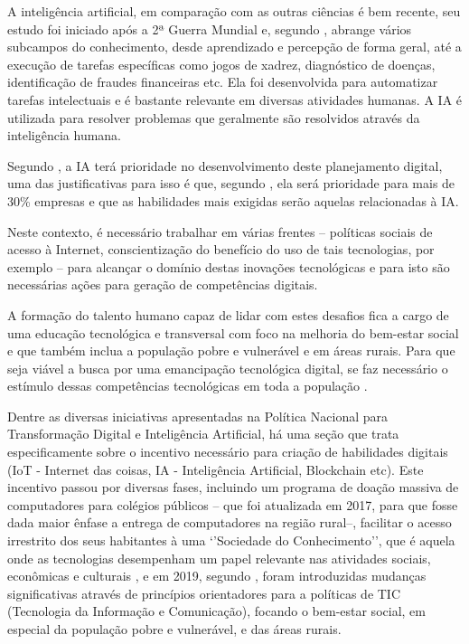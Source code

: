 A inteligência artificial, em comparação com as outras ciências é bem recente, seu estudo foi iniciado após a 2ª Guerra Mundial e, segundo \cite{gomes2010inteligencia}, abrange vários subcampos do conhecimento, desde aprendizado e percepção de forma geral, até a execução de tarefas específicas como jogos de xadrez, diagnóstico de doenças, identificação de fraudes financeiras etc. Ela foi desenvolvida para automatizar tarefas intelectuais e é bastante relevante em diversas atividades humanas. A IA é utilizada para resolver problemas que geralmente são resolvidos através da inteligência humana.

Segundo \cite{de2019politica}, a IA terá prioridade no desenvolvimento deste planejamento digital, uma das justificativas para isso é que, segundo \cite{andrews2017predicts}, ela será prioridade para mais de 30\% empresas e que as habilidades mais exigidas serão aquelas relacionadas à IA.

Neste contexto, é necessário trabalhar em várias frentes -- políticas sociais de acesso à Internet, conscientização do benefício do uso de tais tecnologias, por exemplo -- para alcançar o domínio destas inovações tecnológicas e para isto são necessárias ações para geração de competências digitais.

A formação do talento humano capaz de lidar com estes desafios fica a cargo de uma educação tecnológica e transversal com foco na melhoria do bem-estar social e que também inclua a população pobre e vulnerável e em áreas rurais. Para que seja viável a busca por uma emancipação tecnológica digital, se faz necessário o estímulo dessas competências tecnológicas em toda a população \cite{de2019politica}.

Dentre as diversas iniciativas apresentadas na Política Nacional para Transformação Digital e Inteligência Artificial, há uma seção que trata especificamente sobre o incentivo necessário para criação de habilidades digitais (IoT - Internet das coisas, IA - Inteligência Artificial, Blockchain etc). Este incentivo passou por diversas fases, incluindo um programa de doação massiva de computadores para colégios públicos \cite{compes3063} -- que foi atualizada em 2017, para que fosse dada maior ênfase a entrega de computadores na região rural--, facilitar o acesso irrestrito dos seus habitantes à uma `'Sociedade do Conhecimento'', que é aquela onde as tecnologias desempenham um papel relevante nas atividades sociais, econômicas e culturais \cite{informationsociety}, e em 2019, segundo \cite{de2019politica}, foram introduzidas mudanças significativas através de princípios orientadores para a políticas de TIC (Tecnologia da Informação e Comunicação), focando o bem-estar social, em especial da população pobre e vulnerável, e das áreas rurais.

